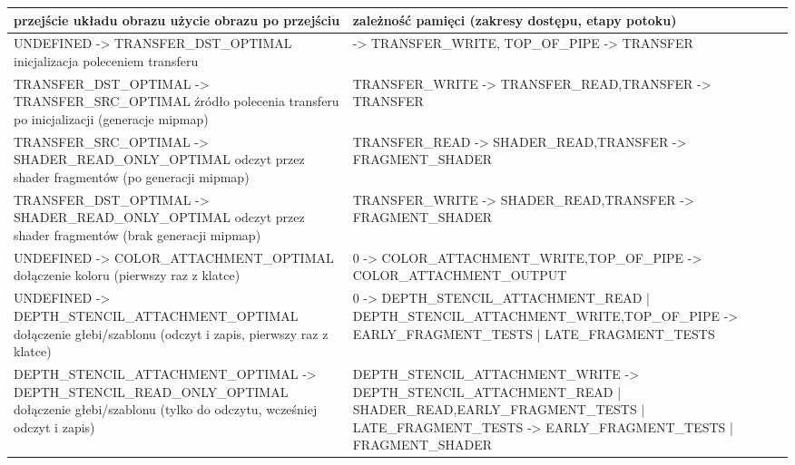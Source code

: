 \begin{center}
	\begin{longtable}{ |>{\RaggedRight}p{7cm}||>{\RaggedRight}p{7cm}|}
		\hline
		przejście układu obrazu \newline użycie obrazu po przejściu & zależność pamięci (zakresy dostępu, etapy potoku) \\
		\hline \hline
		\mbox{UNDEFINED} -> \mbox{TRANSFER\_DST\_OPTIMAL} \newline inicjalizacja poleceniem transferu & 0 -> \mbox{TRANSFER\_WRITE}, \mbox{TOP\_OF\_PIPE} -> \mbox{TRANSFER} \\
		\hline
		\mbox{TRANSFER\_DST\_OPTIMAL} -> \mbox{TRANSFER\_SRC\_OPTIMAL} \newline źródło polecenia transferu po inicjalizacji (generacje mipmap) & \mbox{TRANSFER\_WRITE} -> \mbox{TRANSFER\_READ},\newline \mbox{TRANSFER} -> \mbox{TRANSFER} \\
		\hline
		\mbox{TRANSFER\_SRC\_OPTIMAL} -> \mbox{SHADER\_READ\_ONLY\_OPTIMAL} \newline odczyt przez shader fragmentów (po generacji mipmap) & \mbox{TRANSFER\_READ} -> \mbox{SHADER\_READ},\newline \mbox{TRANSFER} -> \mbox{FRAGMENT\_SHADER} \\
		\hline 
		\mbox{TRANSFER\_DST\_OPTIMAL} -> \mbox{SHADER\_READ\_ONLY\_OPTIMAL} \newline odczyt przez shader fragmentów  (brak generacji mipmap) & \mbox{TRANSFER\_WRITE} -> \mbox{SHADER\_READ},\newline \mbox{TRANSFER} -> \mbox{FRAGMENT\_SHADER} \\
		\hline 
		\mbox{UNDEFINED} -> \mbox{COLOR\_ATTACHMENT\_OPTIMAL} \newline dołączenie koloru (pierwszy raz z klatce) & \mbox{0} -> \mbox{COLOR\_ATTACHMENT\_WRITE},\newline \mbox{TOP\_OF\_PIPE} -> \mbox{COLOR\_ATTACHMENT\_OUTPUT} \\
		\hline 
		\mbox{UNDEFINED} -> \mbox{DEPTH\_STENCIL\_ATTACHMENT\_OPTIMAL} \newline dołączenie głebi/szablonu (odczyt i zapis, pierwszy raz z klatce) & \mbox{0} -> \mbox{DEPTH\_STENCIL\_ATTACHMENT\_READ} | \mbox{DEPTH\_STENCIL\_ATTACHMENT\_WRITE},\newline \mbox{TOP\_OF\_PIPE} -> \mbox{EARLY\_FRAGMENT\_TESTS} | \mbox{LATE\_FRAGMENT\_TESTS} \\
		\hline 
		\mbox{DEPTH\_STENCIL\_ATTACHMENT\_OPTIMAL} -> \mbox{DEPTH\_STENCIL\_READ\_ONLY\_OPTIMAL} \newline dołączenie głebi/szablonu (tylko do odczytu, wcześniej odczyt i zapis) & \mbox{DEPTH\_STENCIL\_ATTACHMENT\_WRITE} -> \mbox{DEPTH\_STENCIL\_ATTACHMENT\_READ} | \mbox{SHADER\_READ},\newline \mbox{EARLY\_FRAGMENT\_TESTS} | \mbox{LATE\_FRAGMENT\_TESTS} -> \mbox{EARLY\_FRAGMENT\_TESTS} | \mbox{FRAGMENT\_SHADER} \\

\end{longtable}
\end{center}

